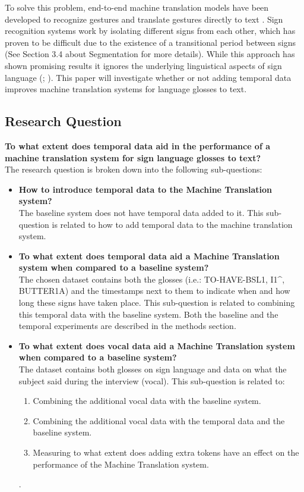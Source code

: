 To solve this problem, end-to-end machine translation models have been developed to recognize gestures and translate gestures directly to text \cite{de2020sign}. Sign recognition systems work by isolating different signs from each other, which has proven to be difficult due to the existence of a transitional period between signs \cite{konradoffentliches}  (See Section 3.4 about Segmentation for more details). While this approach has shown promising results it ignores the underlying linguistical aspects of sign language (\citealp{camgoz2018neural}; \citealp{perniss2007}). This paper will investigate whether or not adding temporal data improves machine translation systems for language glosses to text.

\subsection{Research Question}

\textbf{To what extent does temporal data aid in the performance of a machine translation system for sign language glosses to text?}
\\
The research question is broken down into the following sub-questions:
\begin{itemize}
    \item \textbf{How to introduce temporal data to the Machine Translation system?} \\
    The baseline system does not have temporal data added to it. This sub-question is related to how to add temporal data to the machine translation system.
    \item \textbf{To what extent does temporal data aid a Machine Translation system when compared to a baseline system?} \\
    The chosen dataset \cite{dgscorpus_3} contains both the glosses (i.e.: TO-HAVE-BSL1, I1\textasciicircum, BUTTER1A) and the timestamps next to them to indicate when and how long these signs have taken place. This sub-question is related to combining this temporal data with the baseline system. Both the baseline and the temporal experiments are described in the methods section.
    \\
    \item \textbf{To what extent does vocal data aid a Machine Translation system when compared to a baseline system?} \\
    The dataset contains both glosses on sign language and data on what the subject said during the interview (vocal). This sub-question is related to:
    \begin{enumerate}
        \item Combining the additional vocal data with the baseline system.
        \item Combining the additional vocal data with the temporal data and the baseline system.
        \item Measuring to what extent does adding extra tokens have an effect on the performance of the Machine Translation system.
    \end{enumerate}.
\end{itemize}

